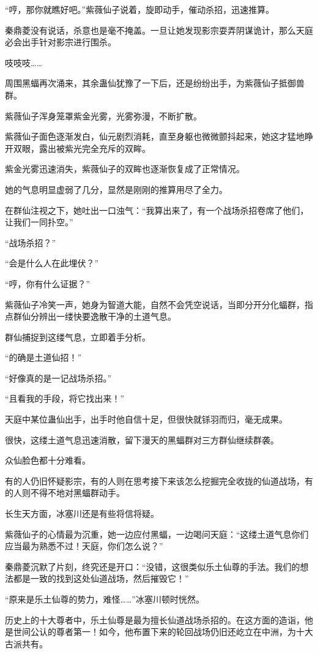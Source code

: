 \begin{this_body}
“哼，那你就瞧好吧。”紫薇仙子说着，旋即动手，催动杀招，迅速推算。

秦鼎菱没有说话，杀意也是毫不掩盖。一旦让她发现影宗耍弄阴谋诡计，那么天庭必会出手针对影宗进行围杀。

吱吱吱……

周围黑蝠再次涌来，其余蛊仙犹豫了一下后，还是纷纷出手，为紫薇仙子抵御兽群。

紫薇仙子浑身笼罩紫金光雾，光雾弥漫，不断扩散。

紫薇仙子面色逐渐发白，仙元剧烈消耗，直至身躯也微微颤抖起来，她这才猛地睁开双眼，露出被紫光完全充斥的双眸。

紫金光雾迅速消失，紫薇仙子的双眸也逐渐恢复成了正常情况。

她的气息明显虚弱了几分，显然是刚刚的推算用尽了全力。

在群仙注视之下，她吐出一口浊气：“我算出来了，有一个战场杀招卷席了他们，让我们一同扑空。”

“战场杀招？”

“会是什么人在此埋伏？”

“哼，你有什么证据？”

紫薇仙子冷笑一声，她身为智道大能，自然不会凭空说话，当即分开分化蝠群，指点群仙分辨出一缕快要逸散干净的土道气息。

群仙捕捉到这缕气息，立即着手分析。

“的确是土道仙招！”

“好像真的是一记战场杀招。”

“且看我的手段，将它找出来！”

天庭中某位蛊仙出手，出手时他自信十足，但很快就铩羽而归，毫无成果。

很快，这缕土道气息迅速消散，留下漫天的黑蝠群对三方群仙继续群袭。

众仙脸色都十分难看。

有的人仍旧怀疑影宗，有的人则在思考接下来该怎么挖掘完全收拢的仙道战场，有的人则不得不地对黑蝠群动手。

长生天方面，冰塞川还是有些将信将疑。

紫薇仙子的心情最为沉重，她一边应付黑蝠，一边喝问天庭：“这缕土道气息你们应当最为熟悉不过！天庭，你们怎么说？”

秦鼎菱沉默了片刻，终究还是开口：“没错，这很类似乐土仙尊的手法。我们的想法都是一致的找到这处仙道战场，然后摧毁它！”

“原来是乐土仙尊的势力，难怪……”冰塞川顿时恍然。

历史上的十大尊者中，乐土仙尊是最为擅长仙道战场杀招的。在这方面的造诣，他是世间公认的尊者第一！如今，他布置下来的轮回战场仍旧还屹立在中洲，为十大古派共有。


\end{this_body}
